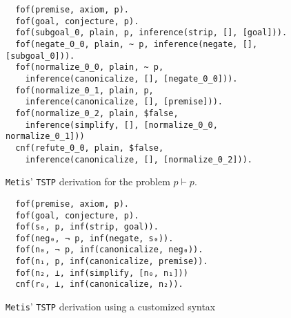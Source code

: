 \documentclass[../paper.tex]{subfiles}
\begin{document}
\begin{subappendices}
\begin{figure}
\begin{verbatim}
  fof(premise, axiom, p).
  fof(goal, conjecture, p).
  fof(subgoal_0, plain, p, inference(strip, [], [goal])).
  fof(negate_0_0, plain, ~ p, inference(negate, [], [subgoal_0])).
  fof(normalize_0_0, plain, ~ p,
    inference(canonicalize, [], [negate_0_0])).
  fof(normalize_0_1, plain, p,
    inference(canonicalize, [], [premise])).
  fof(normalize_0_2, plain, $false,
    inference(simplify, [], [normalize_0_0, normalize_0_1]))
  cnf(refute_0_0, plain, $false,
    inference(canonicalize, [], [normalize_0_2])).
\end{verbatim}
\caption{\texttt{Metis}' \texttt{TSTP} derivation for the
problem $p\vdash p$.}
\label{fig:metis-proof-tstp}
\end{figure}

\clearpage
\begin{figure}[!ht]
\begin{verbatim}
  fof(premise, axiom, p).
  fof(goal, conjecture, p).
  fof(s₀, p, inf(strip, goal)).
  fof(neg₀, ¬ p, inf(negate, s₀)).
  fof(n₀, ¬ p, inf(canonicalize, neg₀)).
  fof(n₁, p, inf(canonicalize, premise)).
  fof(n₂, ⊥, inf(simplify, [n₀, n₁]))
  cnf(r₀, ⊥, inf(canonicalize, n₂)).
\end{verbatim}
\caption{\texttt{Metis}' \texttt{TSTP} derivation using a customized syntax}
\label{fig:metis-proof-tstp-customized}
\end{figure}
\vfill


\end{subappendices}
\end{document}
